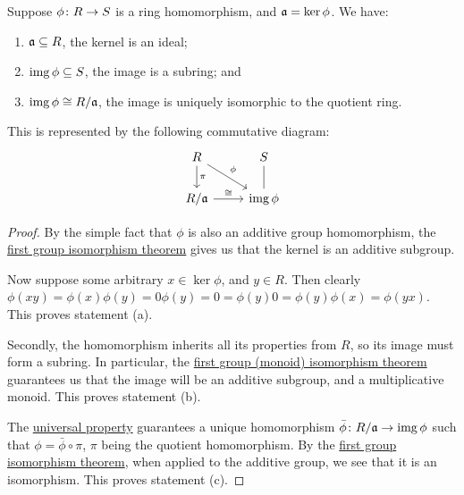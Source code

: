 \begin{theorem}\label{thm:iso-1-ring}
    Suppose \(\phi\colon R\to S\) is a ring homomorphism,
    and \(\mathfrak{a} = \ker\phi\).
    We have:
    \begin{enumerate}[label={(\alph*)}, itemsep=0mm]
        \item \(\mathfrak{a} \subseteq R\), the kernel is an ideal;
        \item \(\operatorname{img}\phi \subseteq S\), the image is a subring; and
        \item \(\operatorname{img}\phi \cong R/\mathfrak{a}\),
            the image is uniquely isomorphic to the quotient ring.
    \end{enumerate}

    This is represented by the following commutative diagram:
    \begin{equation*}
        \begin{tikzcd}
            R \arrow{rd}{\phi} \arrow{d}{\pi} & S \\
            R/\mfk{a} \arrow{r}{\cong} & \img\phi \arrow[dash]{u}
        \end{tikzcd}
    \end{equation*}
\end{theorem}
\begin{proof}
    By the simple fact that \(\phi\) is also an additive group homomorphism,
    the \hyperref[thm:iso-1-group]{first group isomorphism theorem}
    gives us that the kernel is an additive subgroup.

    Now suppose some arbitrary \(x \in \ker\phi\), and \(y \in R\).
    Then clearly \(\phi(xy) = \phi(x)\phi(y) = 0\phi(y) = 0= 
    \phi(y)0 = \phi(y)\phi(x) = \phi(yx)\).
    This proves statement (a).

    \medskip

    Secondly, the homomorphism inherits all its properties from \(R\),
    so its image must form a subring.
    In particular,
    the \hyperref[thm:iso-1-group]{first group (monoid) isomorphism theorem}
    guarantees us that the image will be an additive subgroup,
    and a multiplicative monoid.
    This proves statement (b).

    \medskip

    The \hyperref[thm:univ-prop-quotient-ring]{universal property}
    guarantees a unique homomorphism \(\bar{\phi}\colon R/\mathfrak{a}\to\operatorname{img}\phi\)
    such that \(\phi = \bar{\phi}\circ\pi\),
    \(\pi\) being the quotient homomorphism.
    By the \hyperref[thm:iso-1-group]{first group isomorphism theorem},
    when applied to the additive group,
    we see that it is an isomorphism.
    This proves statement (c).
\end{proof}

